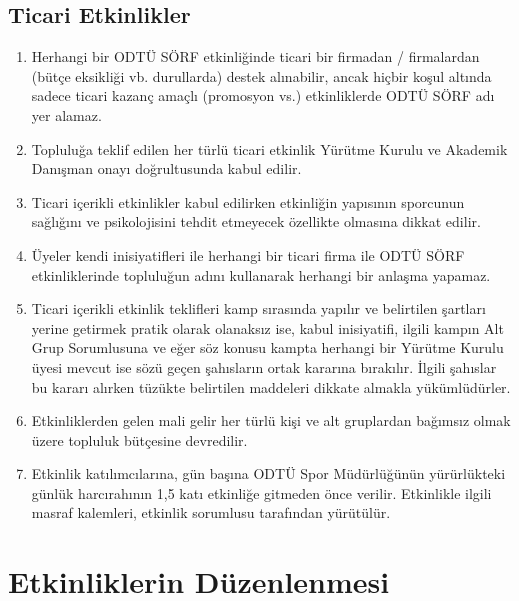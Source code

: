 \documentclass[11pt,a4paper]{article}
\begin{document}
\subsection{Ticari Etkinlikler}
\begin{enumerate}
    \item Herhangi bir ODTÜ SÖRF etkinliğinde ticari bir firmadan / firmalardan (bütçe eksikliği vb. durullarda) destek alınabilir, ancak hiçbir koşul altında sadece ticari kazanç amaçlı (promosyon vs.) etkinliklerde ODTÜ SÖRF adı yer alamaz.
    \item Topluluğa teklif edilen her türlü ticari etkinlik Yürütme Kurulu ve Akademik Danışman onayı doğrultusunda kabul edilir.
    \item Ticari içerikli etkinlikler kabul edilirken etkinliğin yapısının sporcunun sağlığını ve psikolojisini tehdit etmeyecek özellikte olmasına dikkat edilir.
    \item Üyeler kendi inisiyatifleri ile herhangi bir ticari firma ile ODTÜ SÖRF etkinliklerinde topluluğun adını kullanarak herhangi bir anlaşma yapamaz.
    \item Ticari içerikli etkinlik teklifleri kamp sırasında yapılır ve belirtilen şartları yerine getirmek pratik olarak olanaksız ise, kabul inisiyatifi, ilgili kampın Alt Grup Sorumlusuna ve eğer söz konusu kampta herhangi bir Yürütme Kurulu üyesi mevcut ise sözü geçen şahısların ortak kararına bırakılır. İlgili şahıslar bu kararı alırken tüzükte belirtilen maddeleri dikkate almakla yükümlüdürler.
    \item Etkinliklerden gelen mali gelir her türlü kişi ve alt gruplardan bağımsız olmak üzere topluluk bütçesine devredilir.
    \item Etkinlik katılımcılarına, gün başına ODTÜ Spor Müdürlüğünün yürürlükteki günlük harcırahının 1,5 katı etkinliğe gitmeden önce verilir. Etkinlikle ilgili masraf kalemleri, etkinlik sorumlusu tarafından yürütülür.
\end{enumerate}

\section{Etkinliklerin Düzenlenmesi}
\end{document}

